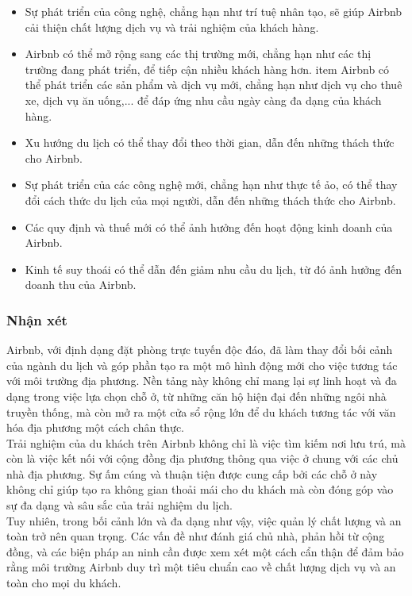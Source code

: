 \begin{tcbraster}[raster columns=2, boxrule=0mm, arc=0mm]
\begin{tcolorbox}[equal height group=B, size=fbox, colback=swotO!60, colframe=swotO!80!black, title=\textsc{opportunities}]
\begin{itemize}
\item Sự phát triển của công nghệ, chẳng hạn như trí tuệ nhân tạo, sẽ giúp Airbnb cải thiện chất lượng dịch vụ và trải nghiệm của khách hàng.
\item Airbnb có thể mở rộng sang các thị trường mới, chẳng hạn như các thị trường đang phát triển, để tiếp cận nhiều khách hàng hơn.
item Airbnb có thể phát triển các sản phẩm và dịch vụ mới, chẳng hạn như dịch vụ cho thuê xe, dịch vụ ăn uống,... để đáp ứng nhu cầu ngày càng đa dạng của khách hàng.
\end{itemize}
\end{tcolorbox}
\begin{tcolorbox}[equal height group=B, size=fbox, colback=swotT!60, colframe=swotT!80!black, title=\textsc{threats}]
\begin{itemize}
\item Xu hướng du lịch có thể thay đổi theo thời gian, dẫn đến những thách thức cho Airbnb.
\item Sự phát triển của các công nghệ mới, chẳng hạn như thực tế ảo, có thể thay đổi cách thức du lịch của mọi người, dẫn đến những thách thức cho Airbnb.
\item Các quy định và thuế mới có thể ảnh hưởng đến hoạt động kinh doanh của Airbnb.
\item Kinh tế suy thoái có thể dẫn đến giảm nhu cầu du lịch, từ đó ảnh hưởng đến doanh thu của Airbnb.
\end{itemize}
\end{tcolorbox}
\end{tcbraster}
\subsubsection{Nhận xét}
\hspace*{1cm}Airbnb, với định dạng đặt phòng trực tuyến độc đáo, đã làm thay đổi bối cảnh của ngành du lịch và góp phần tạo ra một mô hình động mới cho việc tương tác với môi trường địa phương. Nền tảng này không chỉ mang lại sự linh hoạt và đa dạng trong việc lựa chọn chỗ ở, từ những căn hộ hiện đại đến những ngôi nhà truyền thống, mà còn mở ra một cửa sổ rộng lớn để du khách tương tác với văn hóa địa phương một cách chân thực.\\
\hspace*{1cm}Trải nghiệm của du khách trên Airbnb không chỉ là việc tìm kiếm nơi lưu trú, mà còn là việc kết nối với cộng đồng địa phương thông qua việc ở chung với các chủ nhà địa phương. Sự ấm cúng và thuận tiện được cung cấp bởi các chỗ ở này không chỉ giúp tạo ra không gian thoải mái cho du khách mà còn đóng góp vào sự đa dạng và sâu sắc của trải nghiệm du lịch.\\ \hspace*{1cm}Tuy nhiên, trong bối cảnh lớn và đa dạng như vậy, việc quản lý chất lượng và an toàn trở nên quan trọng. Các vấn đề như đánh giá chủ nhà, phản hồi từ cộng đồng, và các biện pháp an ninh cần được xem xét một cách cẩn thận để đảm bảo rằng môi trường Airbnb duy trì một tiêu chuẩn cao về chất lượng dịch vụ và an toàn cho mọi du khách.